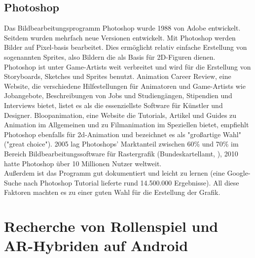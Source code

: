 \documentclass[extern,palatino]{cgBA}
\begin{document}
\subsection{Photoshop}
Das Bildbearbeitungsprogramm Photoshop wurde 1988 von Adobe entwickelt. Seitdem wurden mehrfach neue Versionen entwickelt. Mit Photoshop werden Bilder auf Pixel-basis bearbeitet. Dies ermöglicht relativ einfache Erstellung von sogenannten Sprites, also Bildern die als Basis für 2D-Figuren dienen.
\\
Photoshop ist unter Game-Artists weit verbreitet und wird für die Erstellung von Storyboards, Sketches und Sprites benutzt. Animation Career Review, eine Website, die verschiedene Hilfestellungen für Animatoren und Game-Artists wie Jobangebote, Beschreibungen von Jobs und Studiengängen, Stipendien und Interviews bietet, listet es als die essenziellste Software für Künstler und Designer. Bloopanimation, eine Website die Tutorials, Artikel und Guides zu Animation im Allgemeinen und zu Filmanimation im Speziellen bietet, empfiehlt Photoshop ebenfalls für %
2d-Animation und bezeichnet es als "großartige Wahl" ("great choice"). 2005 lag Photoshops' Marktanteil zwischen 60\% und 70\% im Bereich Bildbearbeitungssoftware für Rastergrafik (Bundeskartellamt, %
), 2010 hatte Photoshop über 10 Millionen Nutzer weltweit.
\\
Außerdem ist das Programm gut dokumentiert und leicht zu lernen (eine Google-Suche nach Photoshop Tutorial lieferte rund 14.500.000 Ergebnisse). All diese Faktoren machten es zu einer guten Wahl für die Erstellung der Grafik.
\newpage

\section{Recherche von Rollenspiel und AR-Hybriden auf Android}
\end{document}
